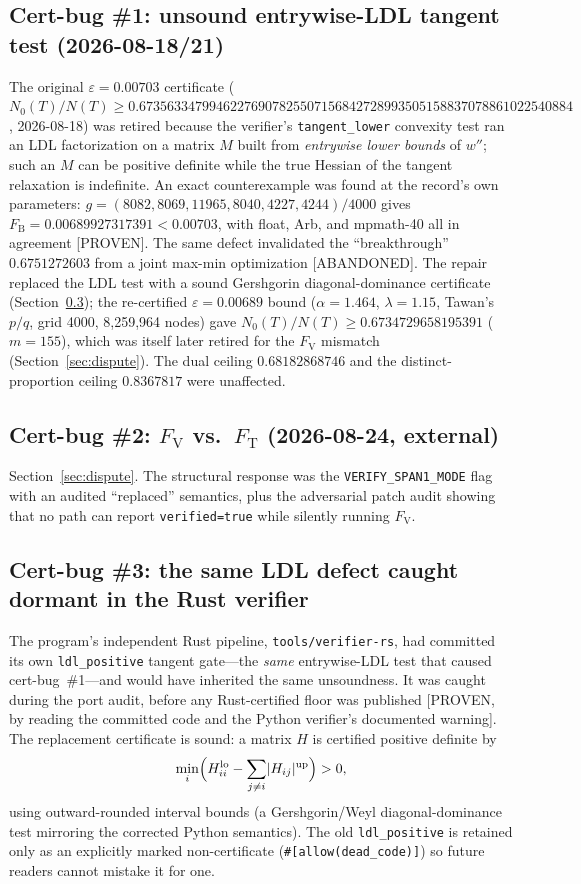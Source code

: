 \documentclass[11pt]{article}
\newcommand{\eps}{\varepsilon}
\newcommand{\Fv}{F_{\mathrm{V}}}
\newcommand{\Ft}{F_{\mathrm{T}}}
\newcommand{\FtB}{F_{\mathrm{B}}}
\begin{document}
\subsection{Cert-bug \#1: unsound entrywise-LDL tangent test (2026-08-18/21)}
The original $\eps = 0.00703$ certificate
($N_0(T)/N(T) \ge 0.67356334799462276907825507156842728993505158837078861022540884$,
2026-08-18) was retired because the verifier's \texttt{tangent\_lower} convexity
test ran an LDL factorization on a matrix $M$ built from \emph{entrywise lower
bounds} of $w''$; such an $M$ can be positive definite while the true Hessian of
the tangent relaxation is indefinite. An exact counterexample was found at the
record's own parameters: $g = (8082,8069,11965,8040,4227,4244)/4000$ gives
$\FtB = 0.00689927317391 < 0.00703$, with float, Arb, and mpmath-40 all in
agreement [PROVEN]. The same defect invalidated the ``breakthrough''
$0.6751272603$ from a joint max-min optimization [ABANDONED]. The repair
replaced the LDL test with a sound Gershgorin diagonal-dominance certificate
(Section~\ref{sec:gershgorin}); the re-certified $\eps = 0.00689$ bound
($\alpha = 1.464$, $\lambda = 1.15$, Tawan's $p/q$, grid 4000, 8{,}259{,}964
nodes) gave $N_0(T)/N(T) \ge 0.6734729658195391$ ($m=155$), which was itself
later retired for the $\Fv$ mismatch (Section~\ref{sec:dispute}). The dual
ceiling $0.68182868746$ and the distinct-proportion ceiling $0.8367817$ were
unaffected.

\subsection{Cert-bug \#2: $\Fv$ vs.\ $\Ft$ (2026-08-24, external)}
Section~\ref{sec:dispute}. The structural response was the
\texttt{VERIFY\_SPAN1\_MODE} flag with an audited ``replaced'' semantics, plus
the adversarial patch audit showing that no path can report
\texttt{verified=true} while silently running $\Fv$.

\subsection{Cert-bug \#3: the same LDL defect caught dormant in the Rust verifier}
\label{sec:gershgorin}
The program's independent Rust pipeline, \texttt{tools/verifier-rs}, had
committed its own \texttt{ldl\_positive} tangent gate---the \emph{same}
entrywise-LDL test that caused cert-bug~\#1---and would have inherited the same
unsoundness. It was caught during the port audit, before any Rust-certified
floor was published [PROVEN, by reading the committed code and the Python
verifier's documented warning]. The replacement certificate is sound: a matrix
$H$ is certified positive definite by
\[
\min_i\Bigl( H_{ii}^{\mathrm{lo}} - \sum_{j\neq i} \lvert H_{ij}\rvert^{\mathrm{up}} \Bigr) > 0,
\]
using outward-rounded interval bounds (a Gershgorin/Weyl diagonal-dominance
test mirroring the corrected Python semantics). The old \texttt{ldl\_positive}
is retained only as an explicitly marked non-certificate
(\texttt{\#[\allowbreak allow(dead\_code)]}) so future readers cannot mistake it
for one.
\end{document}
